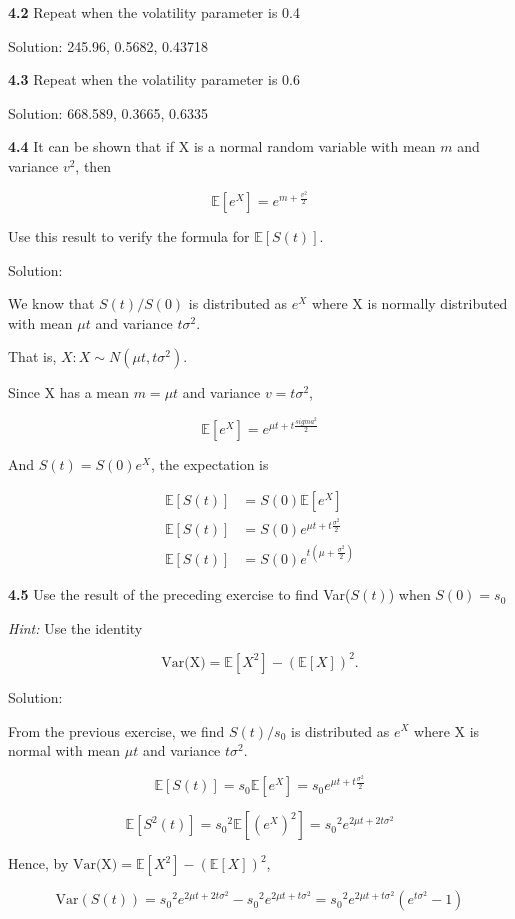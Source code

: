 \documentclass[12pt]{article}
\begin{document}
\noindent \textbf{4.2} Repeat when the volatility parameter is 0.4


Solution: 245.96, 0.5682, 0.43718

\noindent \textbf{4.3} Repeat when the volatility parameter is 0.6

Solution: 668.589, 0.3665, 0.6335

\noindent \textbf{4.4} It can be shown that if X is a normal random variable with mean $m$ and variance $v^2$, then

\[
\mathbb{E}[e^X] = e^{m + \frac{v^2}{2}}
\]

\noindent Use this result to verify the formula for $\mathbb{E}[S(t)]$.


Solution: 

We know that $S(t) / S(0)$  is distributed as $e^X$ where X is normally distributed with mean $\mu t$ and variance $t\sigma^2$. 

That is, $X: X \sim N(\mu t, t\sigma^2)$. 

Since X has a mean $m = \mu t$ and variance $v = t\sigma^2$,

\[
\mathbb{E}[e^X] = e^{\mu t + t\frac{sigma^2}{2}}
\]

And $S(t) = S(0)e^X$, the expectation is 

\begin{align*}
    \mathbb{E}[S(t)] &= S(0)\mathbb{E}[e^X] \\
    \mathbb{E}[S(t)] &= S(0)e^{\mu t + t\frac{\sigma^2}{2}} \\
    \mathbb{E}[S(t)] &= S(0)e^{t(\mu + \frac{\sigma^2}{2})} 
\end{align*}



\noindent \textbf{4.5} Use the result of the preceding exercise to find Var($S(t)$) when $S(0) = s_0$

\textit{Hint:} Use the identity

\[
\text{Var(X)} = \mathbb{E}[X^2] - (\mathbb{E}[X])^2.
\]

Solution:

From the previous exercise, we find $S(t) / s_0$ is distributed as $e^X$ where X is normal with mean $\mu t$ and variance $t\sigma^2$.

\[
\mathbb{E}[S(t)] = s_0 \mathbb{E}[e^X] = s_0 e^{\mu t + t \frac{\sigma^2}{2}}
\]

\[
\mathbb{E}[S^2(t)] = {s_0}^2 \mathbb{E}[(e^X)^2] = {s_0}^2 e^{2\mu t + 2 t\sigma^2}
\]

Hence, by $\text{Var(X)} = \mathbb{E}[X^2] - (\mathbb{E}[X])^2$, 

\[
\text{Var}(S(t)) = {s_0}^2 e^{2\mu t + 2t\sigma^2}- {s_0}^2 e^{2 \mu t + t \sigma^2} = {s_0}^2 e^{2\mu t + t\sigma^2}(e^{t\sigma^2} - 1) 
\]
\end{document}
